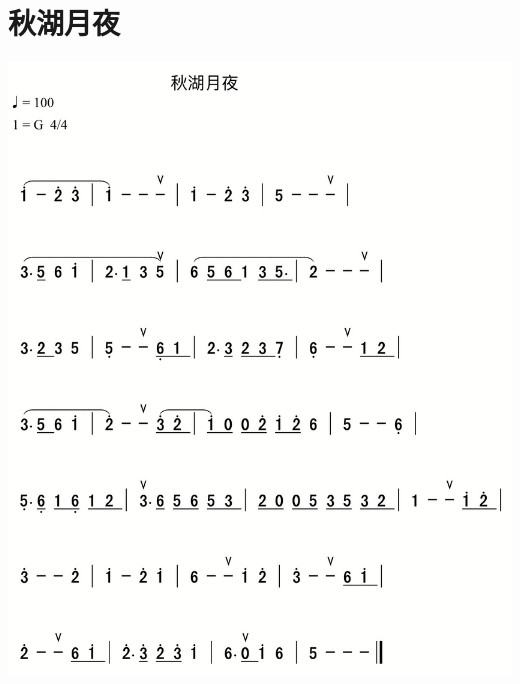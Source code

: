 \documentclass[cn,pad,chinese,chinesefont=nofont]{elegantbook}
\begin{document}
\section{秋湖月夜}   
	\includegraphics[width=\textwidth]{dongxiao/IMG_0866-秋湖月夜.png}
\end{document}
